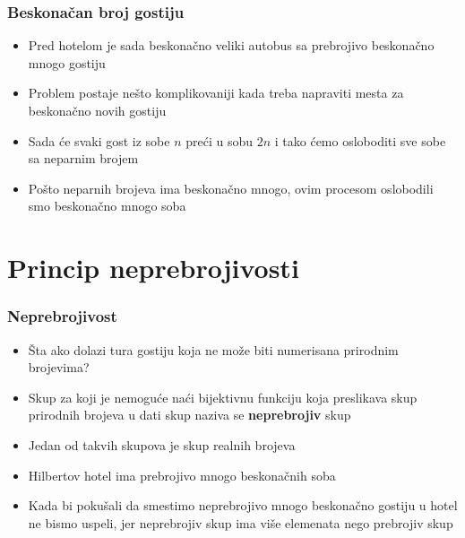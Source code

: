 \documentclass{beamer}
\begin{document}
\begin{frame}[fragile]\frametitle{Beskonačan broj gostiju}
\begin{itemize}
    \item Pred hotelom je sada beskonačno veliki autobus sa prebrojivo beskonačno mnogo gostiju
    \item Problem postaje nešto komplikovaniji kada treba napraviti mesta za beskonačno novih gostiju
    \item Sada će svaki gost iz sobe $n$ preći u sobu $2n$ i tako ćemo osloboditi sve sobe sa neparnim brojem
    \item Pošto neparnih brojeva ima beskonačno mnogo, ovim procesom oslobodili smo beskonačno mnogo soba
\end{itemize}
\end{frame}

\section{Princip neprebrojivosti}
\begin{frame}[fragile]\frametitle{Neprebrojivost}
\begin{itemize}
 \item Šta ako dolazi tura gostiju koja ne može biti numerisana prirodnim brojevima?
    \item Skup za koji je nemoguće naći bijektivnu funkciju koja preslikava skup prirodnih brojeva u dati skup naziva se \textbf{neprebrojiv} skup
    \item Jedan od takvih skupova je skup realnih brojeva
\end{itemize}
\begin{itemize}
    \item Hilbertov hotel ima prebrojivo mnogo beskonačnih soba
    \item Kada bi pokušali da smestimo neprebrojivo mnogo beskonačno gostiju u hotel ne bismo uspeli, jer neprebrojiv skup ima više elemenata nego prebrojiv skup
\end{itemize}
\end{frame}
\end{document}
